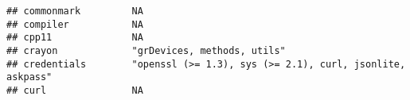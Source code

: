 \documentclass[
]{article}
\begin{document}
\begin{verbatim}
## commonmark         NA                                                                                                                                                                                                                                                                                                                                                                                                                                           
## compiler           NA                                                                                                                                                                                                                                                                                                                                                                                                                                           
## cpp11              NA                                                                                                                                                                                                                                                                                                                                                                                                                                           
## crayon             "grDevices, methods, utils"                                                                                                                                                                                                                                                                                                                                                                                                                  
## credentials        "openssl (>= 1.3), sys (>= 2.1), curl, jsonlite, askpass"                                                                                                                                                                                                                                                                                                                                                                                    
## curl               NA                                                                                                                                                                                                                                                                                                                                                                                                                                           

\end{verbatim}
\end{document}
